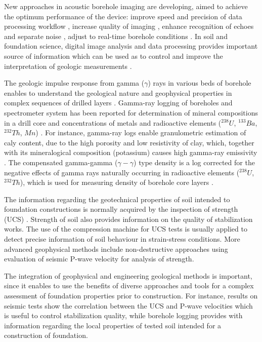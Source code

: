 \documentclass[USenglish,twocolumn]{article}
\begin{document}
New approaches in acoustic borehole imaging are developing, aimed to achieve the optimum performance of the device: improve speed and precision of data processing workflow \cite{schepers1991development,DELTOMBE2004161}, increase quality of imaging \cite{ALSIT2015139}, enhance recognition of echoes and separate noise \cite{WEDGE2017157}, adjust to real-time borehole conditions \cite{Jerram}. In soil and foundation science, digital image analysis and data processing provides important source of information which can be used as to control and improve the interpretation of geologic measurements \cite{Kaellenetal2014,Kallenetal2016,Lemenkov2021c}.

The geologic impulse response from gamma ($\gamma$) rays in various beds of borehole enables to understand the geological nature and geophysical properties in complex sequences of drilled layers \cite{Conaway}. Gamma-ray logging of boreholes and spectrometer system has been reported for determination of mineral compositions in a drill core \cite{Ajayi} and concentrations of metals and radioactive elements ($^{238}U$, $^{133}Ba$, $^{232}Th$, $Mn$) \cite{Loevborg,Mikesell}. For instance, gamma-ray logs enable granulometric estimation of caly content, due to the high porosity and low resistivity of clay, which, together with its mineralogical composition (potassium) causes high gamma-ray emissivity \cite{Bhuyan,DIAZCURIEL2021104481}. The compensated gamma-gamma ($\gamma-\gamma$) type density is a log corrected for the negative effects of gamma rays naturally occurring in  radioactive elements ($^{238}U$, $^{232}Th$), which is used for measuring density of borehole core layers \cite{osti_5961810,osti_5614551}.

The information regarding the geotechnical properties of soil intended to foundation constructions is normally acquired by the inspection of strength (UCS) \cite{LindhWinter,Lemenkov2021b,Lemenkov2021a}. Strength of soil also provides information on the quality of stabilization works. The use of the compression machine for UCS tests is usually applied to detect precise information of soil behaviour in strain-stress conditions. More advanced geophysical methods include non-destructive approaches using evaluation of seismic P-wave velocity for analysis of strength. 

The integration of geophysical and engineering geological methods is important, since it enables to use the benefits of diverse approaches and tools for a complex assessment of foundation properties prior to construction. For instance, results on seismic tests show the correlation between the UCS and P-wave velocities which is useful to control stabilization quality, while borehole logging provides with information regarding the local properties of tested soil intended for a construction of foundation.
\end{document}
